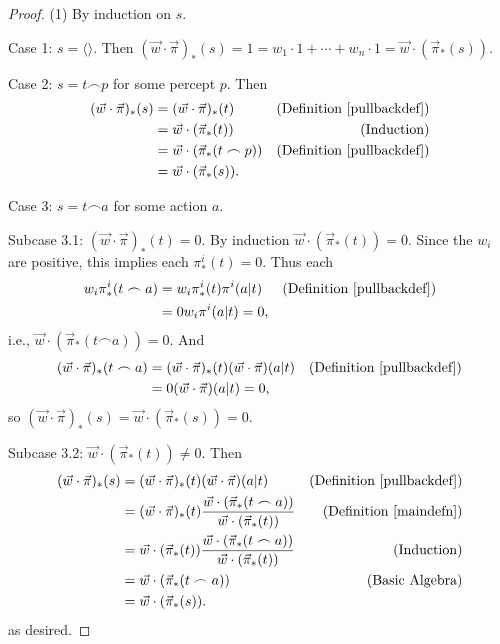 \documentclass[runningheads]{llncs}
\begin{document}
\begin{proof}
    (1) By induction on $s$.

    Case 1: $s=\langle\rangle$. Then
    $(\vec w\cdot\vec\pi)_*(s)=1=w_1\cdot 1+\cdots+w_n\cdot 1
    =\vec w\cdot (\vec\pi_*(s))$.

    Case 2: $s=t\frown p$ for some percept $p$. Then
    \begin{align*}
        (\vec w\cdot \vec\pi)_*(s)
            &= (\vec w\cdot\vec\pi)_*(t)
                &\mbox{(Definition \ref{pullbackdef})}\\
            &= \vec w\cdot(\vec\pi_*(t))
                &\mbox{(Induction)}\\
            &= \vec w\cdot(\vec\pi_*(t\frown p))
                &\mbox{(Definition \ref{pullbackdef})}\\
            &= \vec w\cdot(\vec\pi_*(s)).
    \end{align*}

    Case 3: $s=t\frown a$ for some action $a$.

    Subcase 3.1: $(\vec w\cdot \vec\pi)_*(t)=0$.
        By induction $\vec w\cdot(\vec\pi_*(t))=0$.
        Since the $w_i$ are positive, this implies
        each $\pi^i_*(t)=0$.
        Thus each
        \begin{align*}
            w_i\pi^i_*(t\frown a)
                &= w_i\pi^i_*(t)\pi^i(a|t)
                    &\mbox{(Definition \ref{pullbackdef})}\\
                &= 0w_i\pi^i(a|t)=0,
        \end{align*}
        i.e., $\vec w\cdot(\vec\pi_*(t\frown a))=0$.
        And
        \begin{align*}
            (\vec w\cdot\vec\pi)_*(t\frown a)
                &= (\vec w\cdot\vec\pi)_*(t)(\vec w\cdot\vec\pi)(a|t)
                    &\mbox{(Definition \ref{pullbackdef})}\\
                &= 0(\vec w\cdot\vec\pi)(a|t) = 0,
        \end{align*}
        so $(\vec w\cdot\vec\pi)_*(s)=\vec w\cdot(\vec \pi_*(s))=0$.

    Subcase 3.2: $\vec w\cdot (\vec\pi_*(t))\not=0$. Then
    \begin{align*}
        (\vec w\cdot\vec\pi)_*(s)
            &= (\vec w\cdot\vec\pi)_*(t)(\vec w\cdot\vec\pi)(a|t)
                &\mbox{(Definition \ref{pullbackdef})}\\
            &= (\vec w\cdot\vec\pi)_*(t)
                \frac
                {\vec w\cdot(\vec\pi_*(t\frown a))}
                {\vec w\cdot(\vec\pi_*(t))}
                &\mbox{(Definition \ref{maindefn})}\\
            &= \vec w\cdot(\vec\pi_*(t))
                \frac
                {\vec w\cdot(\vec\pi_*(t\frown a))}
                {\vec w\cdot(\vec\pi_*(t))}
                &\mbox{(Induction)}\\
            &= \vec w\cdot(\vec\pi_*(t\frown a))
                &\mbox{(Basic Algebra)}\\
            &= \vec w\cdot(\vec\pi_*(s)).
    \end{align*}
    as desired.


\end{proof}
\end{document}
